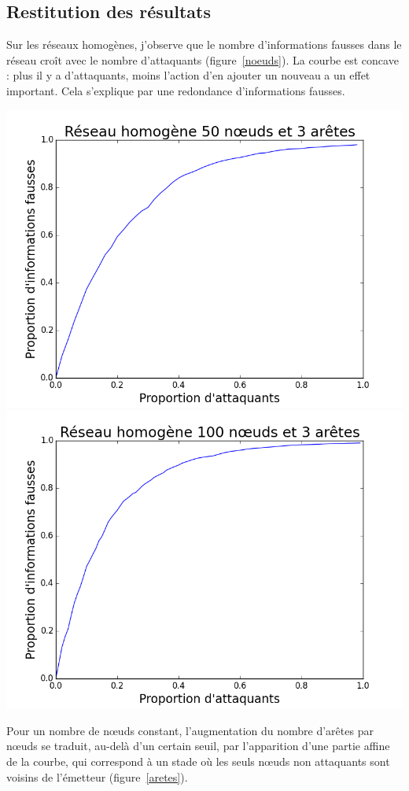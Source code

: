 \documentclass[12pt,a4paper]{article}
\begin{document}
\subsection{Restitution des résultats} %


Sur les réseaux homogènes, j'observe que le nombre d'informations fausses dans le réseau croît avec le nombre d'attaquants (figure~\ref{noeuds}).
La courbe est concave : plus il y a d’attaquants, moins l’action d’en ajouter un nouveau a un effet important.
Cela s'explique par une redondance d'informations fausses.

\begin{center}
\includegraphics[width=0.49\linewidth]{../resultats/atkaleat/atkaleat-50-3-2-i100.png}
\includegraphics[width=0.49\linewidth]{../resultats/atkaleat/atkaleat-100-3-1-i100.png}
 \label{noeuds}
\end{center}

Pour un nombre de nœuds constant, l'augmentation du nombre d'arêtes par nœuds se traduit, au-delà d'un certain seuil, par l'apparition d'une partie affine de la courbe, qui correspond à un stade où les seuls nœuds non attaquants sont voisins de l'émetteur (figure~\ref{aretes}).
\end{document}
